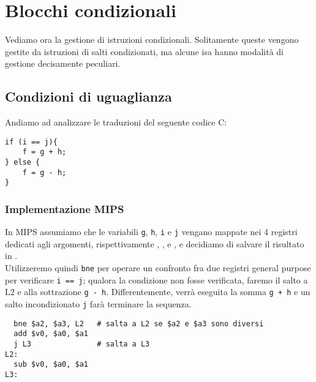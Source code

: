 \documentclass[class=book, crop=false, oneside]{standalone}
\begin{document}
\section{Blocchi condizionali}
Vediamo ora la gestione di istruzioni condizionali. Solitamente queste vengono gestite da istruzioni di salti condizionati, ma alcune \acrshort{isa} hanno modalità di gestione decisamente peculiari.
\subsection*{Condizioni di uguaglianza}
Andiamo ad analizzare le traduzioni del seguente codice C:
\begin{verbatim}
if (i == j){
	f = g + h;
} else {
	f = g - h;
}
\end{verbatim}
\subsubsection{Implementazione MIPS}
In MIPS assumiamo che le variabili \texttt{g}, \texttt{h}, \texttt{i} e \texttt{j} vengano mappate nei 4 registri dedicati agli argomenti, rispettivamente , ,  e , e decidiamo di salvare il risultato in .\\
Utilizzeremo quindi \texttt{bne} per operare un confronto fra due registri general purpose per verificare \texttt{i == j}; qualora la condizione non fosse verificata, faremo il salto a L2 e alla sottrazione \texttt{g - h}. Differentemente, verrà eseguita la somma \texttt{g + h} e un salto incondizionato \texttt{j} farà terminare la sequenza.
\begin{verbatim}
  bne $a2, $a3, L2   # salta a L2 se $a2 e $a3 sono diversi
  add $v0, $a0, $a1
  j L3               # salta a L3
L2:
  sub $v0, $a0, $a1
L3:
\end{verbatim}
\end{document}
